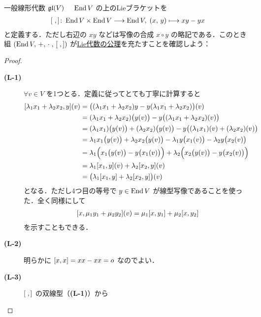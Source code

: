 \documentclass[rep_main]{subfiles}
\begin{document}
\begin{myexample}[label=def:gl-alg]{一般線形代数 $\mathfrak{gl} (V)$}
    　$\operatorname{End} V$ の上のLieブラケットを
    \begin{align}
        \label{eq:Liebracket-gl}
        \comm{\;}{\,} \colon \End V \times \End V \lto \End V,\; (x,\, y) \lmto xy - yx
    \end{align}
    と定義する．ただし右辺の $xy$ などは写像の合成 $x \circ y$ の略記である．このとき組 $(\End V,\, +,\, \cdot\;,\, \comm{\;}{\,})$ が\hyperref[ax:LieAlg]{Lie代数の公理}を充たすことを確認しよう：
    \begin{proof}
        \begin{description}
            \item[\textbf{(L-1)}] $\forall v \in V$ を1つとる．定義に従ってとても丁寧に計算すると
            \begin{align}
                \comm{\lambda_1 x_1 + \lambda_2 x_2}{y}(v) 
                &= \bigl( (\lambda_1 x_1 + \lambda_2 x_2) y - y (\lambda_1 x_1 + \lambda_2 x_2) \bigr)(v) \\
                &= (\lambda_1 x_1 + \lambda_2 x_2) \bigl( y(v) \bigr) - y \bigl((\lambda_1 x_1 + \lambda_2 x_2)(v)\bigr) \\
                &= (\lambda_1 x_1) \bigl(y (v) \bigr) + (\lambda_2 x_2) \bigl( y(v) \bigr) - y \bigl( (\lambda_1 x_1)(v) + (\lambda_2 x_2)(v)  \bigr) \\
                &= \lambda_1 x_1 \bigl(y (v) \bigr) + \lambda_2 x_2 \bigl( y(v) \bigr) - \lambda_1 y \bigl( x_1(v) \bigr) - \lambda_2 y \bigl( x_2(v) \bigr) \\
                &= \lambda_1 \Bigl( x_1 \bigl(y (v) \bigr) - y \bigl( x_1(v) \bigr) \Bigr) + \lambda_2 \Bigl(x_2 \bigl( y(v) \bigr) - y \bigl( x_2(v) \bigr) \Bigr) \\
                &= \lambda_1 \comm{x_1}{y} (v) + \lambda_2 \comm{x_2}{y} (v) \\
                &= \bigl( \lambda_1 \comm{x_1}{y} + \lambda_2 \comm{x_2}{y}  \bigr) (v)
            \end{align}
            となる．ただし4つ目の等号で $y \in \operatorname{End} V$ が線型写像であることを使った．全く同様にして
            \begin{align}
                \comm{x}{\mu_1 y_1 + \mu_2 y_2}(v) = \mu_1 \comm{x}{y_1} + \mu_2 \comm{x}{y_2}
            \end{align}
            を示すこともできる．
            \item[\textbf{(L-2)}] 明らかに $\comm{x}{x} = xx - xx = o$ なのでよい．
            \item[\textbf{(L-3)}] $\comm{\;}{\,}$ の双線型（\textsf{\textbf{(L-1)}}）から

\end{description}
\end{proof}
\end{myexample}
\end{document}
